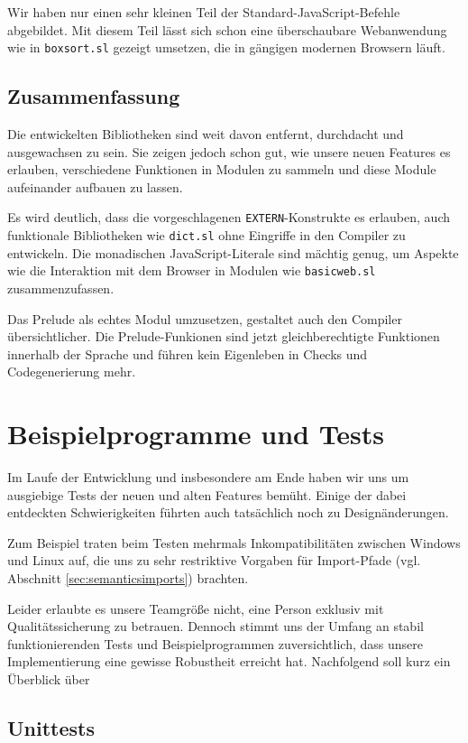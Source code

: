 \documentclass[runningheads]{llncs}
\begin{document}
Wir haben nur einen sehr kleinen Teil der Standard-JavaScript-Befehle
abgebildet. Mit diesem Teil lässt sich schon eine überschaubare Webanwendung
wie in \verb|boxsort.sl| gezeigt umsetzen, die in gängigen modernen Browsern
läuft.

\subsection{Zusammenfassung}

Die entwickelten Bibliotheken sind weit davon entfernt, durchdacht und
ausgewachsen zu sein. Sie zeigen jedoch schon gut, wie unsere neuen Features
es erlauben, verschiedene Funktionen in Modulen zu sammeln und diese Module
aufeinander aufbauen zu lassen.

Es wird deutlich, dass die vorgeschlagenen \verb|EXTERN|-Konstrukte es
erlauben, auch funktionale Bibliotheken wie \verb|dict.sl| ohne Eingriffe
in den Compiler zu entwickeln. Die monadischen JavaScript-Literale sind
mächtig genug, um Aspekte wie die Interaktion mit dem Browser in Modulen
wie \verb|basicweb.sl| zusammenzufassen.

Das Prelude als echtes Modul umzusetzen, gestaltet auch den Compiler
übersichtlicher. Die Prelude-Funkionen sind jetzt gleichberechtigte
Funktionen innerhalb der Sprache und führen kein Eigenleben in Checks und
Codegenerierung mehr.

\section{Beispielprogramme und Tests}
\label{sec:samples}

Im Laufe der Entwicklung und insbesondere am Ende haben wir uns um ausgiebige
Tests der neuen und alten Features bemüht. Einige der dabei entdeckten
Schwierigkeiten führten auch tatsächlich noch zu Designänderungen.

Zum Beispiel traten beim Testen mehrmals Inkompatibilitäten zwischen Windows
und Linux auf, die uns zu sehr restriktive Vorgaben für Import-Pfade
(vgl. Abschnitt \ref{sec:semanticsimports}) brachten.

Leider erlaubte es unsere Teamgröße nicht, eine Person exklusiv mit
Qualitätssicherung zu betrauen. Dennoch stimmt uns der Umfang an stabil
funktionierenden Tests und Beispielprogrammen zuversichtlich, dass unsere
Implementierung eine gewisse Robustheit erreicht hat. Nachfolgend soll
kurz ein Überblick über 

\subsection{Unittests}
\end{document}
